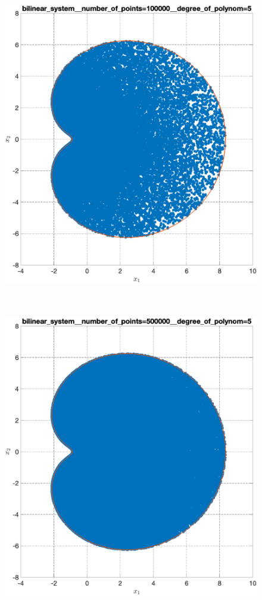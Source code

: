 \documentclass[../main.tex]{subfiles}
\begin{document}
\begin{figure}[ht!]
\begin{minipage}[b]{.3\linewidth}
  		\includegraphics[width=\linewidth]{images/bilinear_system__number_of_points=100000__degree_of_polynom=5.eps}
  	\end{minipage}
  	\hfill
  	\begin{minipage}[b]{.3\linewidth} 
  		\small
  		\centering
  		\includegraphics[width=\linewidth]{images/bilinear_system__number_of_points=500000__degree_of_polynom=5.eps}

\end{minipage}
\end{figure}
\end{document}
